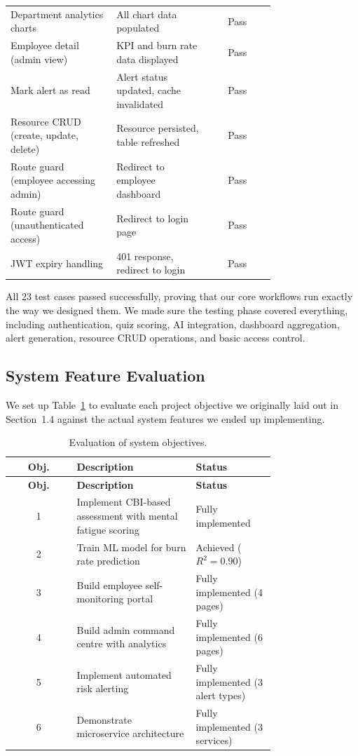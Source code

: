 \documentclass[12pt,a4paper]{article}
\begin{document}
\begin{longtable}{@{}p{0.40\linewidth}p{0.35\linewidth}c@{}}
  Department analytics charts
    & All chart data populated
    & Pass \\
  Employee detail (admin view)
    & KPI and burn rate data displayed
    & Pass \\
  Mark alert as read
    & Alert status updated, cache invalidated
    & Pass \\
  Resource CRUD (create, update, delete)
    & Resource persisted, table refreshed
    & Pass \\
  Route guard (employee accessing admin)
    & Redirect to employee dashboard
    & Pass \\
  Route guard (unauthenticated access)
    & Redirect to login page
    & Pass \\
  JWT expiry handling
    & 401 response, redirect to login
    & Pass \\
\end{longtable}

All 23 test cases passed successfully, proving that our core workflows run exactly the way we designed them. We made sure the testing phase covered everything, including authentication, quiz scoring, AI integration, dashboard aggregation, alert generation, resource CRUD operations, and basic access control.

\subsection{System Feature Evaluation}

We set up Table~\ref{tab:objective-eval} to evaluate each project objective we originally laid out in Section~1.4 against the actual system features we ended up implementing.

\begin{longtable}{@{}cp{0.45\linewidth}p{0.30\linewidth}@{}}
  \caption{Evaluation of system objectives.}
  \label{tab:objective-eval} \\
  \toprule
  \textbf{Obj.} & \textbf{Description} & \textbf{Status} \\
  \midrule
  \endfirsthead
  \toprule
  \textbf{Obj.} & \textbf{Description} & \textbf{Status} \\
  \midrule
  \endhead
  \bottomrule
  \endfoot

  1 & Implement CBI-based assessment with mental fatigue scoring
    & Fully implemented \\
  2 & Train ML model for burn rate prediction
    & Achieved ($R^{2} = 0.90$) \\
  3 & Build employee self-monitoring portal
    & Fully implemented (4 pages) \\
  4 & Build admin command centre with analytics
    & Fully implemented (6 pages) \\
  5 & Implement automated risk alerting
    & Fully implemented (3 alert types) \\
  6 & Demonstrate microservice architecture
    & Fully implemented (3 services) \\
\end{longtable}
\end{document}
